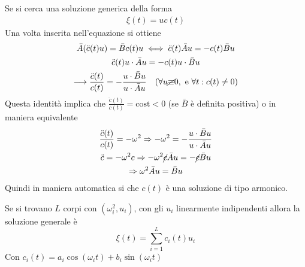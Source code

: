 \documentclass[Main.tex]{subfiles}
\begin{document}
	\begin{osservazioni}
		\item Se si cerca una soluzione generica della forma
		\begin{gather}
			\xi (t) = u c(t)
		\end{gather}
		Una volta inserita nell'equazione si ottiene
		\begin{gather}
			\bar A (\ddot c (t) u ) = \bar B c(t) u
			\iff \ddot c(t) \bar A u = - c (t) \bar B u\\
			\ddot c(t) u \cdot \bar A u = -c(t) u \cdot \bar B u\\
			\longrightarrow \frac{\ddot c(t)}{c(t)} = - \frac{u \cdot \bar B u}{u \cdot \bar A u} \ \ \ (\forall u \cancel \equiv 0, \text{ e } \forall t: c(t) \neq 0)
		\end{gather}
		Questa identità implica che $\frac{\ddot c (t)}{c(t)} = \text{cost} < 0 $ (se $\bar B$ è definita positiva) o in maniera equivalente 
		\begin{gather}
			\frac{\ddot c(t)}{c(t)} = - \omega^2 \Rightarrow -\omega^2 = -\frac{u \cdot \bar B u }{u \cdot \bar A u}\\
			\ddot c = - \omega^2 c \Rightarrow -\omega^2 \cancel{c} \bar A u = - \cancel{c} \bar B u\\
			\Rightarrow \omega^2 \bar A u = \bar B u
		\end{gather}
		Quindi in maniera automatica si che $c(t)$ è una soluzione di tipo armonico.
		\item Se si trovano $L$ corpi con $(\omega_i^2, u_i)$, con gli $u_i$ linearmente indipendenti allora la soluzione generale è 
		\begin{equation}
			\xi(t) = \sum_{i=1}^L c_i (t) u_i
		\end{equation}
		Con $c_i(t) = a_i \cos (\omega_i t) + b_i \sin (\omega_i t )$
		

\end{osservazioni}
\end{document}
